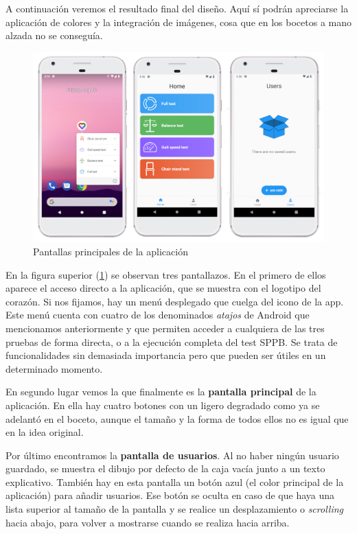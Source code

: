 A continuación veremos el resultado final del diseño. Aquí sí podrán apreciarse la aplicación de colores y la integración de imágenes, cosa que en los bocetos a mano alzada no se conseguía. 

\begin{figure}[H]
	\centering
	\includegraphics[scale=0.4]{imagenes/capturas1.jpg}
	\caption{Pantallas principales de la aplicación\label{fig:capturas1}}
\end{figure}

En la figura superior (\ref{fig:capturas1}) se observan tres pantallazos. En el primero de ellos aparece el acceso directo a la aplicación, que se muestra con el logotipo del corazón. Si nos fijamos, hay un menú desplegado que cuelga del icono de la app. Este menú cuenta con cuatro de los denominados \textit{atajos} de Android que mencionamos anteriormente y que permiten acceder a cualquiera de las tres pruebas de forma directa, o a la ejecución completa del test SPPB. Se trata de funcionalidades sin demasiada importancia pero que pueden ser útiles en un determinado momento.

En segundo lugar vemos la que finalmente es la \textbf{pantalla principal} de la aplicación. En ella hay cuatro botones con un ligero degradado como ya se adelantó en el boceto, aunque el tamaño y la forma de todos ellos no es igual que en la idea original.

Por último encontramos la \textbf{pantalla de usuarios}. Al no haber ningún usuario guardado, se muestra el dibujo por defecto de la caja vacía junto a un texto explicativo. También hay en esta pantalla un botón azul (el color principal de la aplicación) para añadir usuarios. Ese botón se oculta en caso de que haya una lista superior al tamaño de la pantalla y se realice un desplazamiento o \textit{scrolling} hacia abajo, para volver a mostrarse cuando se realiza hacia arriba.

